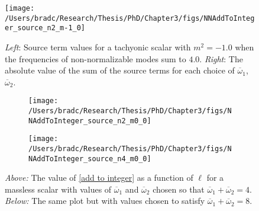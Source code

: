 \documentclass[../PhD.tex]{subfiles}
\newcommand{\oone}{\overline{\omega}_1}
\newcommand{\otwo}{\overline{\omega}_2}
\begin{document}
\begin{figure}
\centering
\texttt{[image: /Users/bradc/Research/Thesis/PhD/Chapter3/figs/NNAddToInteger\_source\_n2\_m-1\_0]}
\caption[Source term for two non-normalizable modes whose frequencies add to an integer when $m^2 = -1$ and $\oone + \otwo = 4$]{{\it Left}: Source term values for a tachyonic scalar with $m^2 = -1.0$ when the frequencies of non-normalizable modes sum to $4.0$. {\it Right}: The absolute value of the sum of the source terms for each choice of $\oone$, $\otwo$.}
\label{fig:atoi_all_m-4_0}
\end{figure}

\begin{figure}[h!]
\centering
	\begin{subfigure}[b]{0.75\textwidth}
		\texttt{[image: /Users/bradc/Research/Thesis/PhD/Chapter3/figs/NNAddToInteger\_source\_n2\_m0\_0]}
		\label{fig:atoi_all_n2_m0}
	\end{subfigure}
	\vspace{-0.25in}
	\begin{subfigure}[b]{0.75\textwidth}
		\texttt{[image: /Users/bradc/Research/Thesis/PhD/Chapter3/figs/NNAddToInteger\_source\_n4\_m0\_0]}
		\label{fig:atoi_all_n4_m0}
	\end{subfigure}
	\caption[Source term for two non-normalizable modes whose frequencies add to an integer when $m^2 = 0$ for $\oone+ \otwo = 4$ and $8$]{{\it Above:} The value of \eqref{add to integer} as a function of $\ell$ for a massless scalar with values of $\oone$ and $\otwo$ chosen so that $\oone + \otwo = 4$. {\it Below:} The same plot but with values chosen to satisfy $\oone + \otwo = 8$.}
	\label{fig:atoi_all_m0_0compare}
\end{figure}
\end{document}
